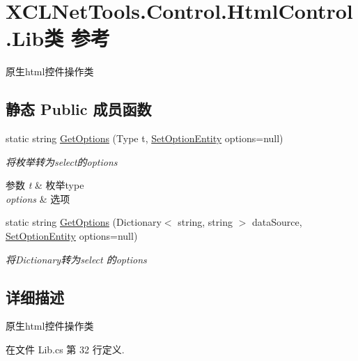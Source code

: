 \hypertarget{class_x_c_l_net_tools_1_1_control_1_1_html_control_1_1_lib}{\section{X\-C\-L\-Net\-Tools.\-Control.\-Html\-Control.\-Lib类 参考}
\label{class_x_c_l_net_tools_1_1_control_1_1_html_control_1_1_lib}
}


原生html控件操作类  


\subsection*{静态 Public 成员函数}
\begin{DoxyCompactItemize}
\item 
static string \hyperlink{class_x_c_l_net_tools_1_1_control_1_1_html_control_1_1_lib_a6bc535ff27a3e67b2c4dac1d5e99aa8c}{Get\-Options} (Type t, \hyperlink{class_x_c_l_net_tools_1_1_entity_1_1_set_option_entity}{Set\-Option\-Entity} options=null)
\begin{DoxyCompactList}\small\item\em 将枚举转为select的options 
\begin{DoxyParams}{参数}
{\em t} & 枚举type\\
\hline
{\em options} & 选项\\
\hline
\end{DoxyParams}
\end{DoxyCompactList}\item 
static string \hyperlink{class_x_c_l_net_tools_1_1_control_1_1_html_control_1_1_lib_aea5ab0601c97a418ef6291f75aa7baff}{Get\-Options} (Dictionary$<$ string, string $>$ data\-Source, \hyperlink{class_x_c_l_net_tools_1_1_entity_1_1_set_option_entity}{Set\-Option\-Entity} options=null)
\begin{DoxyCompactList}\small\item\em 将\-Dictionary转为select 的options \end{DoxyCompactList}\end{DoxyCompactItemize}


\subsection{详细描述}
原生html控件操作类 



在文件 Lib.\-cs 第 32 行定义.



